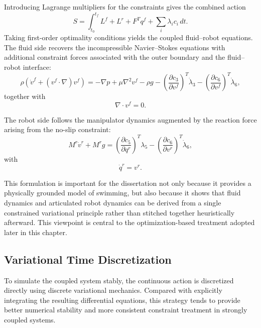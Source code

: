 Introducing Lagrange multipliers for the constraints gives the combined action
\begin{equation}
S = \int_{t_0}^{t_f} L^f + L^r + F^T q^f + \sum_i \lambda_i c_i \, dt .
\label{eq:thesis_combined_action}
\end{equation}
Taking first-order optimality conditions yields the coupled fluid--robot equations. The fluid side recovers the incompressible Navier--Stokes equations with additional constraint forces associated with the outer boundary and the fluid--robot interface:
\begin{equation}
\rho \left(\dot{v}^f + (v^f \cdot \nabla) v^f \right)
= - \nabla p + \mu \nabla^2 v^f - \rho g
- \left(\frac{\partial c_3}{\partial v^f}\right)^T \dot{\lambda}_3
- \left(\frac{\partial c_6}{\partial v^f}\right)^T \dot{\lambda}_6,
\label{eq:thesis_ns_coupled}
\end{equation}
together with
\begin{equation}
\nabla \cdot v^f = 0.
\label{eq:thesis_incompressibility}
\end{equation}

The robot side follows the manipulator dynamics augmented by the reaction force arising from the no-slip constraint:
\begin{equation}
M^r \dot{v}^r + M^r g
=
\left(\frac{\partial c_5}{\partial q^r}\right)^T \lambda_5
-
\left(\frac{\partial c_6}{\partial v^r}\right)^T \dot{\lambda}_6,
\label{eq:thesis_robot_coupled}
\end{equation}
with
\begin{equation}
\dot{q}^r = v^r.
\label{eq:thesis_robot_kinematics}
\end{equation}

This formulation is important for the dissertation not only because it provides a physically grounded model of swimming, but also because it shows that fluid dynamics and articulated robot dynamics can be derived from a single constrained variational principle rather than stitched together heuristically afterward. This viewpoint is central to the optimization-based treatment adopted later in this chapter.

\subsection{Variational Time Discretization}

To simulate the coupled system stably, the continuous action is discretized directly using discrete variational mechanics. Compared with explicitly integrating the resulting differential equations, this strategy tends to provide better numerical stability and more consistent constraint treatment in strongly coupled systems.


